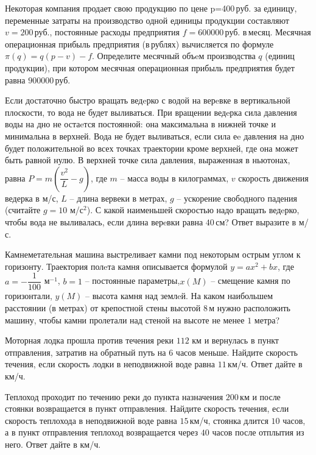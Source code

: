 %
%
%
%
\begin{class}[number=1]
	\begin{listofex}
		\item Некоторая компания продает свою продукцию по цене p=400 руб. за единицу, переменные затраты на производство одной единицы продукции составляют \( v=200 \) руб., постоянные расходы предприятия \( f= 600000 \) руб. в месяц. Месячная операционная прибыль предприятия (в рублях) вычисляется по формуле \( \pi(q)=q(p-v)-f \). Определите месячный объeм производства \( q \) (единиц продукции), при котором месячная операционная прибыль предприятия будет равна \( 900 000 \) руб.
		\item Если достаточно быстро вращать ведeрко с водой на верeвке в вертикальной плоскости, то вода не будет выливаться. При вращении ведeрка сила давления воды на дно не остаeтся постоянной: она максимальна в нижней точке и минимальна в верхней. Вода не будет выливаться, если сила еe давления на дно будет положительной во всех точках траектории кроме верхней, где она может быть равной нулю. В верхней точке сила давления, выраженная в ньютонах, равна \( P=m \left( \dfrac{v^2}{L}-g \right) \), где \( m \) -- масса воды в килограммах, \( v \) скорость движения ведерка в м/с, \( L \) -- длина вервеки в метрах, \( g \) -- ускорение свободного падения (считайте \( g=10 \) м/с\( ^2 \)). С какой наименьшей скоростью надо вращать ведeрко, чтобы вода не выливалась, если длина верeвки равна \( 40 \) см? Ответ выразите в м/с.
		\item Камнеметательная машина выстреливает камни под некоторым острым углом к горизонту. Траектория полeта камня описывается формулой \( y=ax^2+bx \), где \( a=-\dfrac{1}{100} \) м\( ^{-1} \), \( b=1 \) -- постоянные параметры,\( x(M) \) -- смещение камня по горизонтали, \( y(M) \) -- высота камня над землeй. На каком наибольшем расстоянии (в метрах) от крепостной стены высотой \( 8 \) м нужно расположить машину, чтобы камни пролетали над стеной на высоте не менее \( 1 \) метра?
		\item Моторная лодка прошла против течения реки \( 112  \) км и вернулась в пункт отправления, затратив на обратный путь на \( 6 \) часов меньше. Найдите скорость течения, если скорость лодки в неподвижной воде равна \( 11 \) км/ч. Ответ дайте в км/ч.
		\item Теплоход проходит по течению реки до пункта назначения \( 200 \) км и после стоянки возвращается в пункт отправления. Найдите скорость течения, если скорость теплохода в неподвижной воде равна \( 15 \) км/ч, стоянка длится \( 10 \) часов, а в пункт отправления теплоход возвращается через \( 40 \) часов после отплытия из него. Ответ дайте в км/ч.

\end{listofex}
\end{class}
